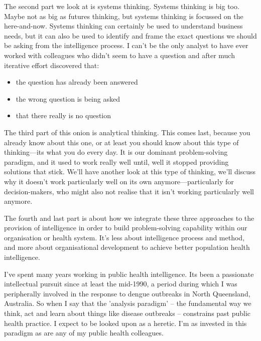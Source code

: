 The second part we look at is systems thinking. Systems thinking is big too. Maybe not as big as futures thinking, but systems thinking is focussed on the here-and-now. Systems thinking can certainly be used to understand business needs, but it can also be used to identify and frame the exact questions we should be asking from the intelligence process. I can't be the only analyst to have ever worked with colleagues who didn't seem to have a question and after much iterative effort discovered that:
\begin{itemize}
	\item the question has already been answered
	\item the wrong question is being asked
	\item that there really is no question
\end{itemize}

The third part of this onion is analytical thinking. This comes last, because you already know about this one, or at least you should know about this type of thinking---its what you do every day. It is our dominant problem-solving paradigm, and it used to work really well until, well it stopped providing solutions that stick. We'll have another look at this type of thinking, we'll discuss why it doesn't work particularly well on its own anymore---particularly for decision-makers, who might also not realise that it isn't working particularly well anymore.

The fourth and last part is about how we integrate these three approaches to the provision of intelligence in order to build problem-solving capability within our organisation or health system. It's less about intelligence process and method, and more about organisational development to achieve better population health intelligence.


I've spent many years working in public health intelligence. Its been a passionate intellectual pursuit since at least the mid-1990, a period during which I was peripherally involved in the response to dengue outbreaks in North Queensland, Australia. So when I say that the 'analysis paradigm' -- the fundamental way we think, act and learn about things like disease outbreaks -- constrains past public health practice. I expect to be looked upon as a heretic. I'm as invested in this paradigm as are any of my public health colleagues.

